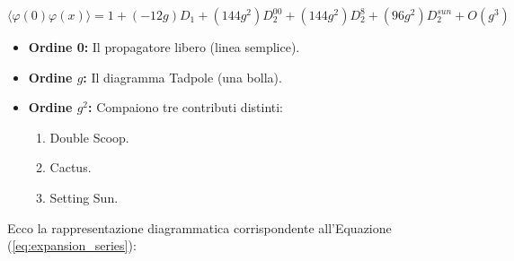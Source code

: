 \begin{equation}
\langle \varphi(0)\varphi(x) \rangle = 1 + (-12g) D_1 + (144g^2) D_{2}^{00} + (144g^2) D_{2}^{8} + (96g^2) D_{2}^{sun} + O(g^3)
\label{eq:expansion_series}
\end{equation}


\begin{itemize}
    \item \textbf{Ordine 0:} Il propagatore libero (linea semplice).
    \item \textbf{Ordine $g$:} Il diagramma Tadpole (una bolla).
    \item \textbf{Ordine $g^2$:} Compaiono tre contributi distinti:
    \begin{enumerate}
        \item Double Scoop.
        \item Cactus.
        \item Setting Sun.
    \end{enumerate}
\end{itemize}

Ecco la rappresentazione diagrammatica corrispondente all'Equazione (\ref{eq:expansion_series}):

